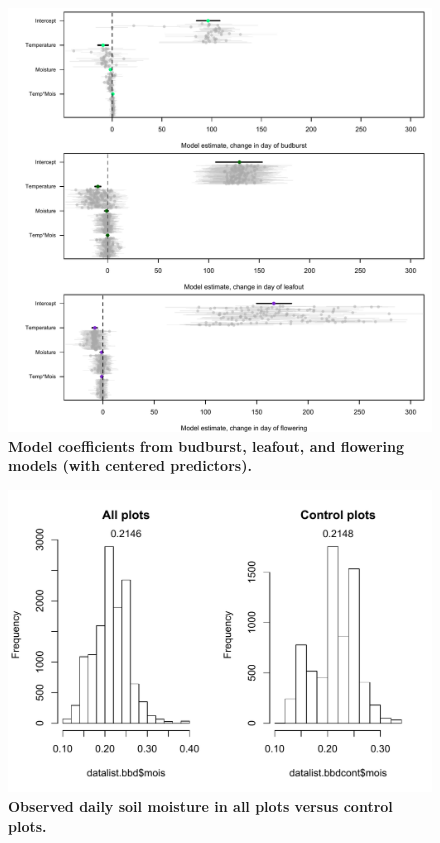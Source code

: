 \documentclass{article}
\begin{document}
\begin{figure}[h]
\centering
 \includegraphics{../../Analyses/soilmoisture/figures/m5bbdlodffd.pdf}
 \caption{\textbf{Model coefficients from budburst, leafout, and flowering models (with centered predictors).}} 
 \label{fig:bb}
 \end{figure}

\begin{figure}[h]
\centering
 \includegraphics{../../Analyses/soilmoisture/figures/soilmoishist_mn.pdf}
 \caption{\textbf{Observed daily soil moisture in all plots versus control plots.}} 
 \label{fig:sm}
 \end{figure}
\end{document}
